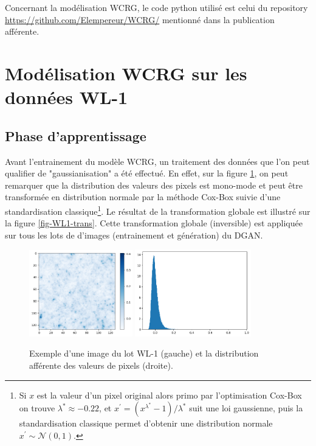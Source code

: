 \documentclass[12pt,twoside]{article}
\begin{document}
Concernant la modélisation WCRG, le code python utilisé est celui du repository \url{https://github.com/Elempereur/WCRG/} mentionné dans la publication afférente.
%
\section{Modélisation WCRG sur les données WL-1}
%
\subsection{Phase d'apprentissage}
\label{sec-wcrg-WL1-learning}
%
Avant l'entrainement du modèle WCRG, un traitement des données que l'on peut qualifier de "gaussianisation" a été effectué. En effet, sur la figure \ref{fig-WL1-non-trans}, on peut remarquer que la distribution des valeurs des pixels est mono-mode et peut être transformée en distribution normale par la méthode Cox-Box suivie d'une standardisation classique\footnote{Si $x$ est la valeur d'un pixel original alors primo par l'optimisation Cox-Box on trouve $\lambda^\ast \approx -0.22$, et $x^\prime = (x^{\lambda^\ast}-1)/\lambda^\ast$ suit une loi gaussienne, puis la standardisation classique permet d'obtenir une distribution normale $x^\prime \sim \mathcal{N}(0,1)$.}. Le résultat de la transformation globale est illustré sur la figure \ref{fig-WL1-trans}. Cette transformation globale (inversible) est appliquée sur tous les lots de d'images (entrainement et génération) du DGAN.
%
\begin{figure}[h]
\centering
\includegraphics[width=0.4\textwidth]{fig-WL1-img-non-transformed.png}
\includegraphics[width=0.45\textwidth]{fig-WL1-pixelval-non-trans.png}
\caption{Exemple d'une image du lot WL-1 (gauche) et la distribution afférente des valeurs de pixels (droite).}
\label{fig-WL1-non-trans}
\end{figure}
\end{document}
